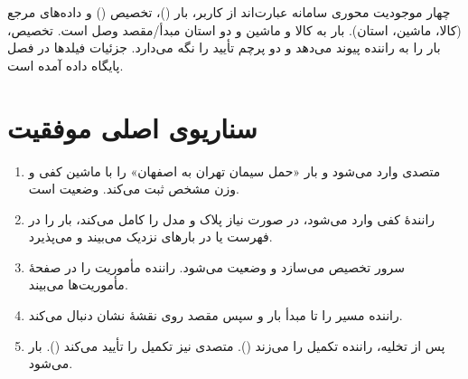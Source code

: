 چهار موجودیت محوری سامانه عبارت‌اند از کاربر، بار ()، تخصیص () و داده‌های مرجع (کالا، ماشین، استان). بار به کالا و ماشین و دو استان مبدأ/مقصد وصل است. تخصیص، بار را به راننده پیوند می‌دهد و دو پرچم تأیید را نگه می‌دارد. جزئیات فیلدها در فصل پایگاه داده آمده است.

\section{سناریوی اصلی موفقیت}

\begin{enumerate}
  \item متصدی وارد می‌شود و بار «حمل سیمان تهران به اصفهان» را با ماشین کفی و وزن مشخص ثبت می‌کند. وضعیت  است.
  \item رانندهٔ کفی وارد می‌شود، در صورت نیاز پلاک و مدل را کامل می‌کند، بار را در فهرست یا در بارهای نزدیک می‌بیند و می‌پذیرد.
  \item سرور تخصیص می‌سازد و وضعیت  می‌شود. راننده مأموریت را در صفحهٔ مأموریت‌ها می‌بیند.
  \item راننده مسیر را تا مبدأ بار و سپس مقصد روی نقشهٔ نشان دنبال می‌کند.
  \item پس از تخلیه، راننده تکمیل را می‌زند (). متصدی نیز تکمیل را تأیید می‌کند (). بار  می‌شود.
\end{enumerate}
